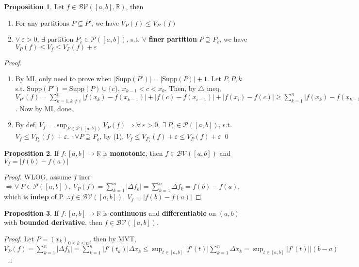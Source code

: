 \documentclass[12pt,a4paper]{article}
\theoremstyle{definition}
\newtheorem{proposition}{Proposition}
\begin{document}
\begin{proposition}
  Let $f \in \mathcal{BV}([a, b], \mathbb{R})$, then
  \begin{enumerate} [(1)]
    \item For any partitions $P \subseteq P'$, we have \underline{$V_P(f) \leq V_{P'}(f)$}
    \item $\forall \ \varepsilon > 0$, $\exists$ partition $P_\varepsilon \in \mathcal{P}([a, b])$, s.t. $\forall$ \textbf{finer partition} $P \supseteq P_\varepsilon$, we have \underline{$V_P(f) \leq V_f \leq V_P(f) + \varepsilon$}
  \end{enumerate}

  \noindent\textit{Proof.}
  \begin{enumerate} [(1)]
    \item By MI, only need to prove when $|\text{Supp}(P')| = |\text{Supp}(P)| + 1$. Let $P, P, k$ s.t. $\text{Supp}(P') = \text{Supp}(P) \cup \{c\}$, $x_{k - 1} < c < x_k$.
    Then, by $\triangle$ ineq, $V_{P'}(f) = \sum_{k = 1, k \neq i}^{n} |f(x_k) - f(x_{k - 1})| + |f(c) - f(x_{i - 1})| + |f(x_i) - f(c)| \geq \sum_{k = 1}^{n}|f(x_k) - f(x_{k - 1})| = V_P(f)$. Now by MI, done.
    \item By def, $V_f = \sup_{P \in \mathcal{P}([a, b])} V_P(f) \Rightarrow \forall\ \varepsilon > 0, \ \exists\ P_\varepsilon \in \mathcal{P}([a, b])$, s.t. $V_f \leq V_{P_\varepsilon}(f) + \varepsilon$. $\therefore \forall P \supseteq P_\varepsilon$, by (1), \underline{$V_f \leq V_{P_\varepsilon}(f) + \varepsilon \leq V_P(f) + \varepsilon$} \qed
  \end{enumerate}
\end{proposition}
\vspace{0.125em}

\begin{proposition}
  If $f: [a, b] \rightarrow \mathbb{R}$ is \textbf{monotonic}, then \underline{$f \in \mathcal{BV}([a, b])$} and \underline{$V_f = |f(b) - f(a)|$}

  \begin{proof}
    WLOG, assume $f$ incr $\Rightarrow \forall \ P \in \mathcal{P}([a, b]), \ V_P(f) = \sum_{k = 1}^{n} |\Delta f_k| = \sum_{k = 1}^{n} \Delta f_k = f(b) - f(a)$, which is \textbf{indep} of P. $\therefore f \in \mathcal{BV}([a, b]),\ V_f = |f(b) - f(a)|$
  \end{proof}
\end{proposition}
\vspace{0.125em}

\begin{proposition}
  If $f: [a, b] \rightarrow \mathbb{R}$ is \textbf{continuous} and \textbf{differentiable} on $(a, b)$ with \textbf{bounded derivative}, then \underline{$f \in \mathcal{BV}([a, b])$}.

  \begin{proof}
    Let $P = (x_k)_{0 \leq k \leq n}$, then by MVT, \newline$V_P(f) = \sum_{k = 1}^{n} |\Delta f_k| = \sum_{k = 1}^{n} |f'(t_k)| \Delta x_k \leq \sup_{t \in [a, b]} |f'(t)| \sum_{k = 1}^{n} \Delta x_k = \sup_{t \in [a, b]} |f'(t)|| (b - a)$
  \end{proof}
\end{proposition}
\vspace{0.125em}
\end{document}
